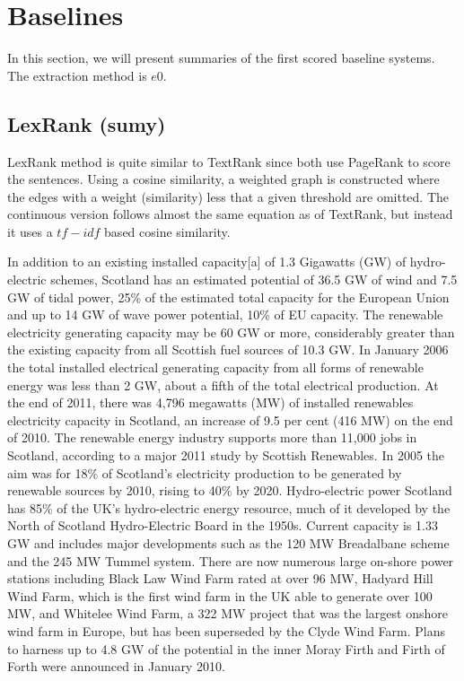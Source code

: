 \section{Baselines}

In this section, we will present summaries of the first scored baseline systems.
The extraction method is $e0$.


\subsection{LexRank (sumy)}

LexRank method \citep{04-erkan-radev} is quite similar to TextRank since both use PageRank \citep{98-brin-page} to score the sentences. 
Using a cosine similarity, a weighted graph is constructed where the edges with a weight (similarity) less that a given threshold are omitted. 
The continuous version follows almost the same equation as of TextRank, but instead it uses a $ tf-idf $ based cosine similarity.

\begin{tcolorbox}\footnotesize
	In addition to an existing installed capacity[a] of 1.3 Gigawatts (GW) of hydro-electric schemes, Scotland has an estimated potential of 36.5 GW of wind and 7.5 GW of tidal power, 25\% of the estimated total capacity for the European Union and up to 14 GW of wave power potential, 10\% of EU capacity.
	The renewable electricity generating capacity may be 60 GW or more, considerably greater than the existing capacity from all Scottish fuel sources of 10.3 GW.
	In January 2006 the total installed electrical generating capacity from all forms of renewable energy was less than 2 GW, about a fifth of the total electrical production.
	At the end of 2011, there was 4,796 megawatts (MW) of installed renewables electricity capacity in Scotland, an increase of 9.5 per cent (416 MW) on the end of 2010.
	The renewable energy industry supports more than 11,000 jobs in Scotland, according to a major 2011 study by Scottish Renewables.
	In 2005 the aim was for 18\% of Scotland's electricity production to be generated by renewable sources by 2010, rising to 40\% by 2020.
	Hydro-electric power Scotland has 85\% of the UK's hydro-electric energy resource, much of it developed by the North of Scotland Hydro-Electric Board in the 1950s.
	Current capacity is 1.33 GW and includes major developments such as the 120 MW Breadalbane scheme and the 245 MW Tummel system.
	There are now numerous large on-shore power stations including Black Law Wind Farm rated at over 96 MW, Hadyard Hill Wind Farm, which is the first wind farm in the UK able to generate over 100 MW, and Whitelee Wind Farm, a 322 MW project that was the largest onshore wind farm in Europe, but has been superseded by the Clyde Wind Farm.
	Plans to harness up to 4.8 GW of the potential in the inner Moray Firth and Firth of Forth were announced in January 2010.	
\end{tcolorbox}

